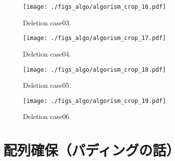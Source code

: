 \begin{figure}[h]
  \vspace{-0.5cm}
  \texttt{[image: ./figs\_algo/algorism\_crop\_16.pdf]}
  \caption{
    Deletion case03.
  }
  \label{fig_IpCHashT_deletion_case03}
  \vspace{-0.5cm}
\end{figure}

\begin{figure}[h]
  \vspace{-0.5cm}
  \texttt{[image: ./figs\_algo/algorism\_crop\_17.pdf]}
  \caption{
    Deletion case04.
  }
  \label{fig_IpCHashT_deletion_case04}
  \vspace{-0.5cm}
\end{figure}

\begin{figure}[h]
  \vspace{-0.5cm}
  \texttt{[image: ./figs\_algo/algorism\_crop\_18.pdf]}
  \caption{
    Deletion case05.
  }
  \label{fig_IpCHashT_deletion_case05}
  \vspace{-0.5cm}
\end{figure}

\begin{figure}[h]
  \vspace{-0.5cm}
  \texttt{[image: ./figs\_algo/algorism\_crop\_19.pdf]}
  \caption{
    Deletion case06.
  }
  \label{fig_IpCHashT_deletion_case05}
  \vspace{-0.5cm}
\end{figure}

\section{配列確保（パディングの話）}









